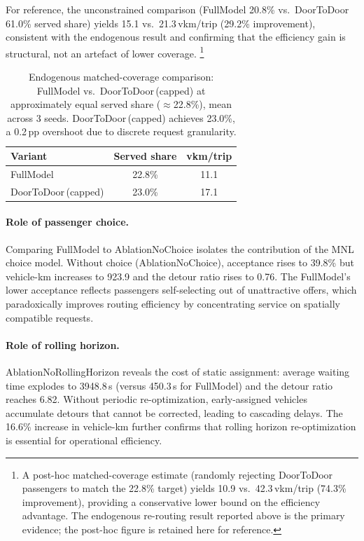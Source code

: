 For reference, the unconstrained comparison (FullModel 20.8\% vs.\ DoorToDoor
61.0\% served share) yields 15.1 vs.\ 21.3\,vkm/trip (29.2\% improvement),
consistent with the endogenous result and confirming that the efficiency
gain is structural, not an artefact of lower coverage.%
\footnote{A post-hoc matched-coverage estimate (randomly rejecting DoorToDoor
passengers to match the 22.8\% target) yields 10.9 vs.\ 42.3\,vkm/trip
(74.3\% improvement), providing a conservative lower bound on the efficiency
advantage. The endogenous re-routing result reported above is the primary
evidence; the post-hoc figure is retained here for reference.}

\begin{table}[h]
\centering
\caption{Endogenous matched-coverage comparison: FullModel vs.\ DoorToDoor\,(capped)
         at approximately equal served share ($\approx$22.8\%), mean across 3 seeds.
         DoorToDoor\,(capped) achieves 23.0\%, a 0.2\,pp overshoot due to discrete
         request granularity.}
\label{tab:matched-coverage}
\begin{tabular}{lcc}
\toprule
Variant & Served share & vkm/trip \\
\midrule
FullModel              & 22.8\% & 11.1 \\
DoorToDoor\,(capped)   & 23.0\% & 17.1 \\
\bottomrule
\end{tabular}
\end{table}

\paragraph{Role of passenger choice.}
Comparing FullModel to AblationNoChoice isolates the contribution of the MNL
choice model. Without choice (AblationNoChoice), acceptance rises to 39.8\%
but vehicle-km increases to 923.9 and the detour ratio rises to 0.76. The
FullModel's lower acceptance reflects passengers self-selecting out of
unattractive offers, which paradoxically improves routing efficiency by
concentrating service on spatially compatible requests.

\paragraph{Role of rolling horizon.}
AblationNoRollingHorizon reveals the cost of static assignment: average
waiting time explodes to 3948.8\,s (versus 450.3\,s for FullModel) and the
detour ratio reaches 6.82. Without periodic re-optimization, early-assigned
vehicles accumulate detours that cannot be corrected, leading to cascading
delays. The 16.6\% increase in vehicle-km further confirms that rolling
horizon re-optimization is essential for operational efficiency.

